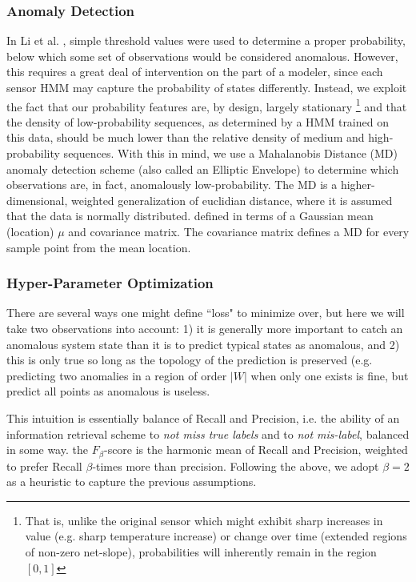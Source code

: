 \documentclass[twocolumn,10pt]{article}
\begin{document}
\subsubsection{Anomaly Detection}
In Li et al. \cite{gas_turbine}, simple threshold values were used to determine a proper probability, below which some set of observations would be considered anomalous. However, this requires a great deal of intervention on the part of a modeler, since each sensor HMM may capture the probability of states differently. Instead, we exploit the fact that our probability features are, by design, largely stationary 
\footnote{That is, unlike the original sensor which might exhibit sharp increases in value (e.g. sharp temperature increase) or change over time (extended regions of non-zero net-slope), probabilities will inherently remain in the region $[0,1]$ }
and that the density of low-probability sequences, as determined by a HMM trained on this data, should be much lower than the relative density of medium and high-probability sequences. With this in mind, we use a Mahalanobis Distance (MD) anomaly detection scheme (also called an Elliptic Envelope) to determine which observations are, in fact, anomalously low-probability. The MD is a higher-dimensional, weighted generalization of euclidian distance, where it is assumed that the data is normally distributed. defined in terms of a Gaussian mean (location) $\mu$ and covariance matrix. The covariance matrix defines a MD for every sample point from the mean location.

\subsubsection{Hyper-Parameter Optimization}
There are several ways one might define ``loss" to minimize over, but here we will take two observations into account: 1) it is generally more important to catch an anomalous system state than it is to predict typical states as anomalous, and 2) this is only true so long as the topology of the prediction is preserved (e.g. predicting two anomalies in a region of order $|W|$ when only one exists is fine, but predict all points as anomalous is useless. 

This intuition is essentially balance of Recall and Precision, i.e. the ability of an information retrieval scheme to \textit{not miss true labels} and to \textit{not mis-label}, balanced in some way. the $F_{\beta}$-score is the harmonic mean of Recall and Precision, weighted to prefer Recall $\beta$-times more than precision. Following the above, we adopt $\beta=2$ as a heuristic to capture the previous assumptions. 
\end{document}
